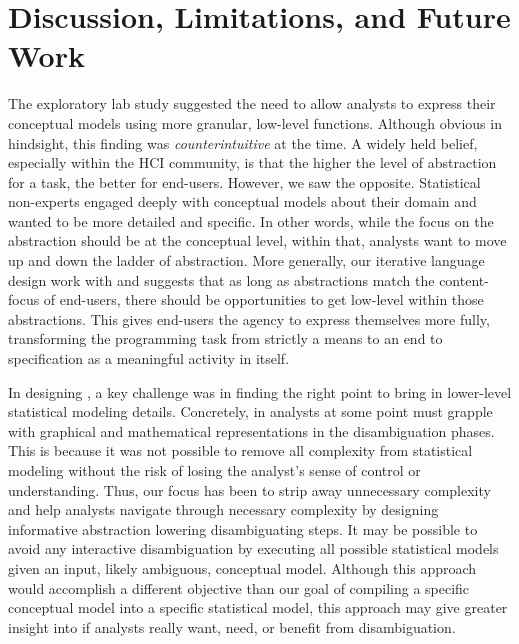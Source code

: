 \section{Discussion, Limitations, and Future Work}
The exploratory lab study suggested the need to allow analysts to express their
conceptual models using more granular, low-level functions. Although obvious in
hindsight, this finding was \textit{counterintuitive} at the time. A widely held
belief, especially within the HCI community, is that the higher the level of
abstraction for a task, the better for end-users. However, we saw the opposite.
Statistical non-experts engaged deeply with conceptual models about their domain
and wanted to be more detailed and specific. In other words, while the focus on
the abstraction should be at the conceptual level, within that, analysts want to
move up and down the ladder of abstraction. More generally, our iterative
language design work with \tisane and \rTisane suggests that as long as
abstractions match the content-focus of end-users, there should be opportunities
to get low-level within those abstractions. This gives end-users the agency to
express themselves more fully, transforming the programming task from strictly a
means to an end to specification as a meaningful activity in itself. 


In designing \rTisane, a key challenge was in finding the right point to bring
in lower-level statistical modeling details. Concretely, in \rTisane analysts at some point must grapple with graphical and
mathematical representations in the disambiguation phases. This is because it
was not possible to remove all complexity from statistical modeling without the
risk of losing the analyst's sense of control or understanding. Thus, our focus
has been to strip away unnecessary complexity and help analysts navigate through
necessary complexity by designing informative abstraction lowering
disambiguating steps. It may be possible to avoid any interactive disambiguation
by executing all possible statistical models given an input, likely ambiguous,
conceptual model. Although this approach would accomplish a different objective
than our goal of compiling a specific conceptual model into a specific
statistical model, this approach may give greater insight into if analysts
really want, need, or benefit from disambiguation. 


